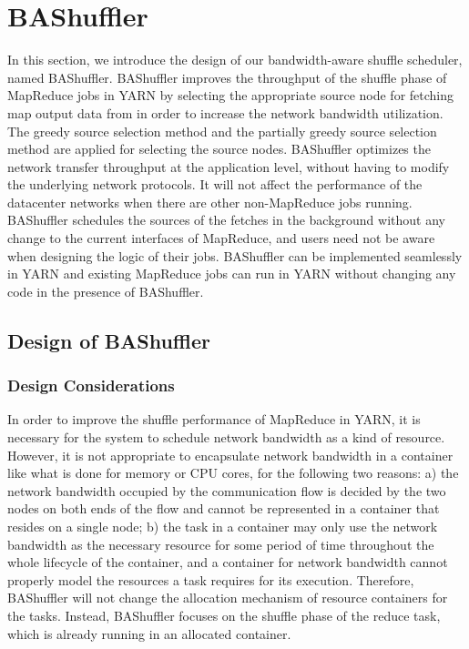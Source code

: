 \documentclass[10pt,journal,compsoc]{IEEEtran}
\begin{document}
\section{BAShuffler}\label{section:bashuffler}
In this section, we introduce the design of our
bandwidth-aware shuffle scheduler, named BAShuffler. 
BAShuffler improves the throughput of the shuffle phase of MapReduce jobs in
YARN by selecting the appropriate source node
for fetching map output data from in order to increase the network bandwidth
utilization.
The greedy source selection method and the partially greedy source
selection method are applied for selecting the source nodes. 
BAShuffler optimizes the network transfer throughput at the application level, 
without having to modify the underlying network protocols. 
It will not affect the performance of the datacenter networks when
there are other non-MapReduce jobs running. 
BAShuffler schedules the sources of the fetches in the background
without any change to the current interfaces of MapReduce, and
users need not be aware when designing the logic of their jobs.
BAShuffler can be implemented seamlessly in YARN and
existing MapReduce jobs can run in YARN without changing any code
in the presence of BAShuffler.

\subsection{Design of BAShuffler}
\subsubsection{Design Considerations}
In order to improve the shuffle performance of MapReduce in YARN, 
it is necessary for the system to schedule network bandwidth as a
kind of resource.
However, it is not appropriate to encapsulate network bandwidth
in a container
like what is done for memory or CPU cores, for the following two reasons: 
a) the network bandwidth occupied by the communication flow is decided
by the two nodes on both ends of the flow
and cannot be represented in a container that resides on a single node; 
b) the task in a container may only use the network bandwidth as the
necessary resource for some period of time
throughout the whole lifecycle of the container, and a container for
network bandwidth cannot properly 
model the resources a task requires for its execution. 
Therefore, BAShuffler will not change the allocation mechanism of
resource containers for the tasks.
Instead, BAShuffler focuses on the shuffle phase of the reduce task,
which is already running in an allocated container.
\end{document}
